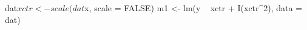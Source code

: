 \begin{Schunk}
\begin{Sinput}
 dat$xctr <- scale(dat$x, scale = FALSE) 
 m1 <- lm(y ~ xctr + I(xctr^2), data = dat)
\end{Sinput}
\end{Schunk}
